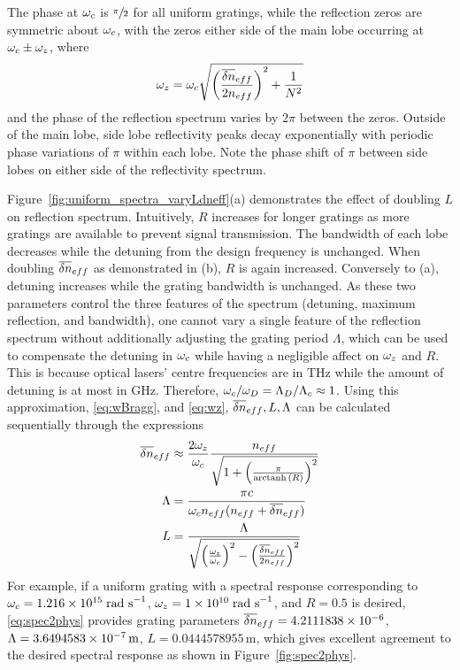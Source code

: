 The phase at $\omega_c$ is $\sfrac{\pi}{2}$ for all uniform gratings, while the reflection zeros are symmetric about $\omega_c$, with the zeros either side of the main lobe occurring at $\omega_c \pm \omega_z$, where
%
\begin{equation}
\label{eq:wz}
    \omega_z = \omega_c \sqrt{\left( \frac{\overline{\delta n}_{eff}}{2 n_{eff}} \right)^2 + \frac{1}{N^2} }
\end{equation}
%
and the phase of the reflection spectrum varies by $2 \pi$ between the zeros. Outside of the main lobe, side lobe reflectivity peaks decay exponentially with periodic phase variations of $\pi$ within each lobe. 
Note the phase shift of $\pi$ between side lobes on either side of the reflectivity spectrum.
%
\par
%
Figure~\ref{fig:uniform_spectra_varyLdneff}(a) demonstrates the effect of doubling $L$ on reflection spectrum. 
Intuitively, $R$ increases for longer gratings as more gratings are available to prevent signal transmission. 
The bandwidth of each lobe decreases while the detuning from the design frequency is unchanged. When doubling $\overline{\delta n}_{eff}$ as demonstrated in (b), $R$ is again increased. 
Conversely to (a), detuning increases while the grating bandwidth is unchanged. As these two parameters control the three features of the spectrum (detuning, maximum reflection, and bandwidth), 
one cannot vary a single feature of the reflection spectrum without additionally adjusting the grating period $\Lambda$, which can be used to compensate the detuning in $\omega_c$ while having a negligible affect on $\omega_z$ and $R$. 
This is because optical lasers' centre frequencies are in THz while the amount of detuning is at most in GHz. Therefore, $\omega_c/\omega_D = \Lambda_D/\Lambda_c \approx 1$. 
Using this approximation, \eqref{eq:wBragg}, and \eqref{eq:wz}, $\overline{\delta n}_{eff}, L, \Lambda$ can be calculated sequentially through the expressions
%
\begin{align}
\label{eq:spec2phys}
    \overline{\delta n}_{eff} &\approx \frac{2\omega_z}{\omega_c} \frac{n_{eff}}{\sqrt{1 + \left(\frac{\pi}{\operatorname{arctanh}{(R)}} \right)^2}}
    \\
    \Lambda &= \frac{\pi c}{\omega_c n_{eff} (n_{eff} +\overline{\delta n}_{eff})}
    \\
    L &= \frac{\Lambda}{\sqrt{\left( \frac{\omega_z}{\omega_c} \right)^2 - \left( \frac{\overline{\delta n}_{eff}}{2n_{eff}} \right)^2}}
\end{align}
%
For example, if a uniform grating with a spectral response corresponding to $\omega_c = 1.216\times 10^{15}\; \text{rad s}^{-1}$, $\omega_z = 1\times 10^{10}\; \text{rad s}^{-1}$, and $R = 0.5$ is desired, 
\eqref{eq:spec2phys} provides grating parameters $\overline{\delta n}_{eff}= 4.2111838\times 10^{-6}$, $\Lambda = 3.6494583\times 10^{-7}\,\text{m}$, $L = 0.0444578955\,\text{m}$, 
which gives excellent agreement to the desired spectral response as shown in Figure~\ref{fig:spec2phys}.
%
%
